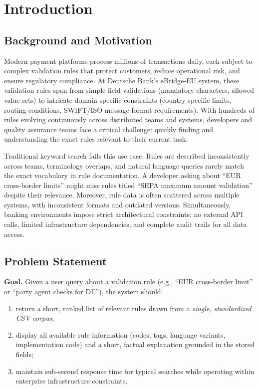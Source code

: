 \chapter{Introduction}\label{ch:introduction}

\section{Background and Motivation}
Modern payment platforms process millions of transactions daily, each subject to complex validation rules that protect customers, reduce operational risk, and ensure regulatory compliance. At Deutsche Bank's eBridge-EU system, these validation rules span from simple field validations (mandatory characters, allowed value sets) to intricate domain-specific constraints (country-specific limits, routing conditions, SWIFT/ISO message-format requirements). With hundreds of rules evolving continuously across distributed teams and systems, developers and quality assurance teams face a critical challenge: quickly finding and understanding the exact rules relevant to their current task.

Traditional keyword search fails this use case. Rules are described inconsistently across teams, terminology overlaps, and natural language queries rarely match the exact vocabulary in rule documentation. A developer asking about ``EUR cross-border limits'' might miss rules titled ``SEPA maximum amount validation'' despite their relevance. Moreover, rule data is often scattered across multiple systems, with inconsistent formats and outdated versions. Simultaneously, banking environments impose strict architectural constraints: no external API calls, limited infrastructure dependencies, and complete audit trails for all data access.

\section{Problem Statement}
\textbf{Goal.} Given a user query about a validation rule (e.g., ``EUR cross-border limit'' or ``party agent checks for DE''), the system should:
\begin{enumerate}[leftmargin=*,itemsep=2pt,topsep=2pt]
 \item return a short, ranked list of relevant rules drawn from a \emph{single, standardized CSV corpus};
 \item display all available rule information (codes, tags, language variants, implementation code) and a short, factual explanation grounded in the stored fields;
 \item maintain sub-second response time for typical searches while operating within enterprise infrastructure constraints.
\end{enumerate}

